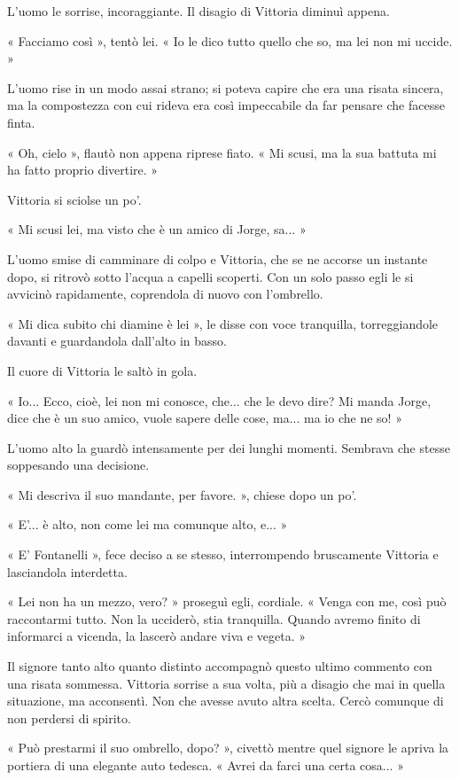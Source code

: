 L'uomo le sorrise, incoraggiante. Il disagio di Vittoria diminuì appena.

« Facciamo così », tentò lei. « Io le dico tutto quello che so, ma lei non mi uccide. »

L'uomo rise in un modo assai strano; si poteva capire che era una risata sincera, ma la compostezza con cui rideva era così impeccabile da far pensare che facesse finta.

« Oh, cielo », flautò non appena riprese fiato. « Mi scusi, ma la sua battuta mi ha fatto proprio divertire. »

Vittoria si sciolse un po'.

« Mi scusi lei, ma visto che è un amico di Jorge, sa... »

L'uomo smise di camminare di colpo e Vittoria, che se ne accorse un instante dopo, si ritrovò sotto l'acqua a capelli scoperti. Con un solo passo egli le si avvicinò rapidamente, coprendola di nuovo con l'ombrello.

« Mi dica subito chi diamine è lei », le disse con voce tranquilla, torreggiandole davanti e guardandola dall'alto in basso.

Il cuore di Vittoria le saltò in gola.

« Io... Ecco, cioè, lei non mi conosce, che... che le devo dire? Mi manda Jorge, dice che è un suo amico, vuole sapere delle cose, ma... ma io che ne so! »

L'uomo alto la guardò intensamente per dei lunghi momenti. Sembrava che stesse soppesando una decisione.

« Mi descriva il suo mandante, per favore. », chiese dopo un po'.

« E'... è alto, non come lei ma comunque alto, e... »

« E' Fontanelli », fece deciso a se stesso, interrompendo bruscamente Vittoria e lasciandola interdetta.

« Lei non ha un mezzo, vero? » proseguì egli, cordiale. « Venga con me, così può raccontarmi tutto. Non la ucciderò, stia tranquilla. Quando avremo finito di informarci a vicenda, la lascerò andare viva e vegeta. »

Il signore tanto alto quanto distinto accompagnò questo ultimo commento con una risata sommessa. Vittoria sorrise a sua volta, più a disagio che mai in quella situazione, ma acconsentì. Non che avesse avuto altra scelta. Cercò comunque di non perdersi di spirito.

« Può prestarmi il suo ombrello, dopo? », civettò mentre quel signore le apriva la portiera di una elegante auto tedesca. «  Avrei da farci una certa cosa... »

